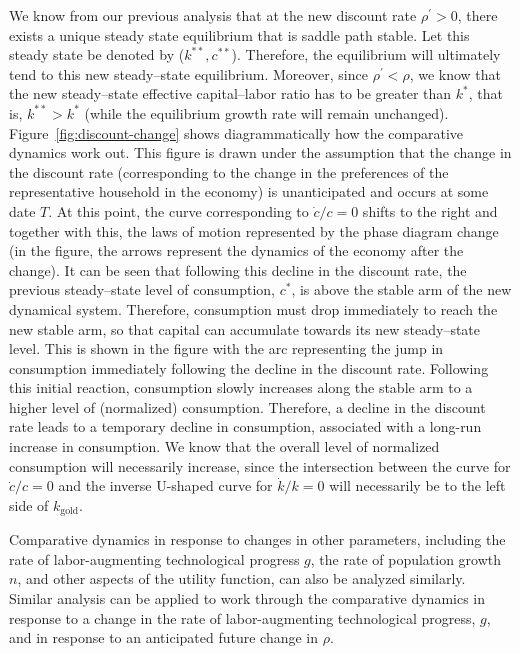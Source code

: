 \documentclass[\topdir/lecture\_notes.tex]{subfiles}
\begin{document}
We know from our previous analysis that at the new discount rate \(\rho^{\prime}>0\), there exists a unique steady state equilibrium that is saddle path stable. Let this steady state be denoted by (\(k^{* *}, c^{* *}\)). Therefore, the equilibrium will ultimately tend to this new steady--state equilibrium. Moreover, since \(\rho^{\prime}<\rho\), we know that the new steady--state effective capital--labor ratio has to be greater than \(k^{*}\), that is, \(k^{* *}>k^{*}\) (while the equilibrium growth rate will remain unchanged). Figure~\ref{fig:discount-change} shows diagrammatically how the comparative dynamics work out. This figure is drawn under the assumption that the change in the discount rate (corresponding to the change in the preferences of the representative household in the economy) is unanticipated and occurs at some date \(T\). At this point, the curve corresponding to \(\dot{c} / c=0\) shifts to the right and together with this, the laws of motion represented by the phase diagram change (in the figure, the arrows represent the dynamics of the economy after the change). It can be seen that following this decline in the discount rate, the previous steady--state level of consumption, \(c^{*}\), is above the stable arm of the new dynamical system. Therefore, consumption must drop immediately to reach the new stable arm, so that capital can accumulate towards its new steady--state level. This is shown in the figure with the arc representing the jump in consumption immediately following the decline in the discount rate. Following this initial reaction, consumption slowly increases along the stable arm to a higher level of (normalized) consumption. Therefore, a decline in the discount rate leads to a temporary decline in consumption, associated with a long-run increase in consumption. We know that the overall level of normalized consumption will necessarily increase, since the intersection between the curve for \(\dot{c} / c=0\) and the inverse U-shaped curve for \(\dot{k} / k=0\) will necessarily be to the left side of \(k_{\text{gold}}\).

Comparative dynamics in response to changes in other parameters, including the rate of labor-augmenting technological progress \(g\), the rate of population growth \(n\), and other aspects of the utility function, can also be analyzed similarly. Similar analysis can be applied to work through the comparative dynamics in response to a change in the rate of labor-augmenting technological progress, \(g\), and in response to an anticipated future change in \(\rho\).
\end{document}

